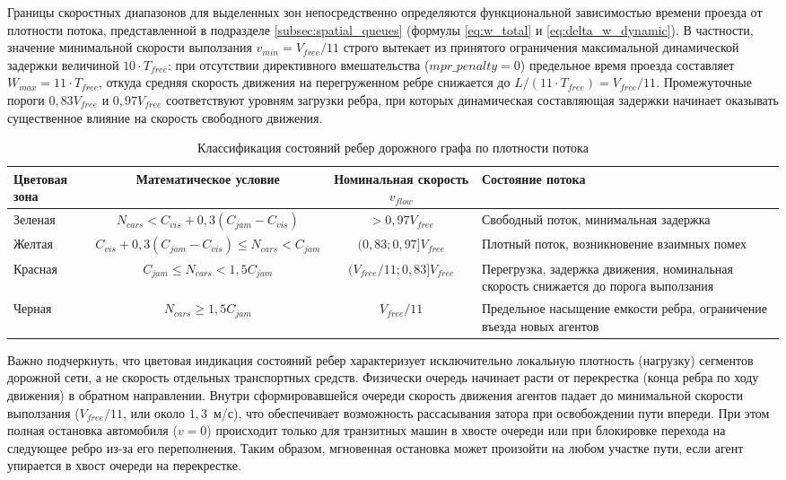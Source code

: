 Границы скоростных диапазонов для выделенных зон непосредственно определяются функциональной зависимостью времени проезда от плотности потока, представленной в подразделе \ref{subsec:spatial_queues} (формулы \ref{eq:w_total} и \ref{eq:delta_w_dynamic}). В частности, значение минимальной скорости выползания $v_{min} = V_{free}/11$ строго вытекает из принятого ограничения максимальной динамической задержки величиной $10 \cdot T_{free}$: при отсутствии директивного вмешательства ($\mathit{mpr\_penalty} = 0$) предельное время проезда составляет $W_{max} = 11 \cdot T_{free}$, откуда средняя скорость движения на перегруженном ребре снижается до $L / (11 \cdot T_{free}) = V_{free}/11$. Промежуточные пороги $0{,}83 V_{free}$ и $0{,}97 V_{free}$ соответствуют уровням загрузки ребра, при которых динамическая составляющая задержки начинает оказывать существенное влияние на скорость свободного движения.


\begin{table}[htbp]
    \caption{Классификация состояний ребер дорожного графа по плотности потока}
    \label{tab:traffic_zones}
    \centering
    \begin{tabular}{|l|c|c|p{5.5cm}|}
        \hline
        Цветовая зона & Математическое условие & Номинальная скорость $v_{flow}$ & Состояние потока \\ \hline
        Зеленая & $N_{cars} < C_{vis} + 0{,}3(C_{jam} - C_{vis})$ & $> 0{,}97 V_{free}$ & Свободный поток, минимальная задержка \\ \hline
        Желтая & $C_{vis} + 0{,}3(C_{jam} - C_{vis}) \le N_{cars} < C_{jam}$ & $(0{,}83; 0{,}97] V_{free}$ & Плотный поток, возникновение взаимных помех \\ \hline
        Красная & $C_{jam} \le N_{cars} < 1{,}5 C_{jam}$ & $(V_{free}/11; 0{,}83] V_{free}$ & Перегрузка, задержка движения, номинальная скорость снижается до порога выползания \\ \hline
        Черная & $N_{cars} \ge 1{,}5 C_{jam}$ & $V_{free}/11$ & Предельное насыщение емкости ребра, ограничение въезда новых агентов \\ \hline
    \end{tabular}
\end{table}

Важно подчеркнуть, что цветовая индикация состояний ребер характеризует исключительно локальную плотность (нагрузку) сегментов дорожной сети, а не скорость отдельных транспортных средств. Физически очередь начинает расти от перекрестка (конца ребра по ходу движения) в обратном направлении. Внутри сформировавшейся очереди скорость движения агентов падает до минимальной скорости выползания ($V_{free}/11$, или около $1{,}3$~м/с), что обеспечивает возможность рассасывания затора при освобождении пути впереди. При этом полная остановка автомобиля ($v = 0$) происходит только для транзитных машин в хвосте очереди или при блокировке перехода на следующее ребро из-за его переполнения. Таким образом, мгновенная остановка может произойти на любом участке пути, если агент упирается в хвост очереди на перекрестке.

